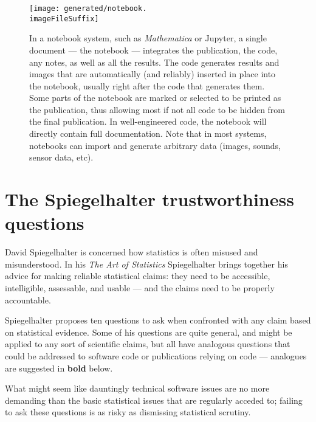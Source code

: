 \documentclass[10pt,a4paper]{article}
\begin{document}
\begin{figure}[t]
   \centering
   \texttt{[image: generated/notebook.\\imageFileSuffix]} 
   \caption{In a notebook system, such as \emph{Mathematica\/} or Jupyter, a single document --- the notebook --- integrates the publication, the code, any notes, as well as all the results. The code generates results and images that are automatically (and reliably) inserted in place into the notebook, usually right after the code that generates them. Some parts of the notebook are marked or selected to be printed as the publication, thus allowing most if not all code to be hidden from the final publication. In well-engineered code, the notebook will directly contain full documentation.
Note that in most systems, notebooks can import and generate arbitrary data (images, sounds, sensor data, etc).}
   \label{supplement-fig:notebook}
\end{figure}

\section{The Spiegelhalter trustworthiness questions}
\label{supplement-Spiegelhalter-section}

David Spiegelhalter is concerned how statistics is often misused and misunderstood. In his \emph{The Art of Statistics\/} \cite{Spiegelhalter} Spiegelhalter brings together his advice for making reliable statistical claims: they need to be accessible, intelligible, assessable, and usable --- and the claims need to be properly accountable. 

Spiegelhalter proposes ten questions to ask when confronted with any claim based on statistical evidence. Some of his questions are quite general, and might be applied to any sort of scientific claims, but all have analogous questions that could be addressed to software code or publications relying on code --- analogues are suggested in \textbf{bold} below. 

What might seem like dauntingly technical software issues are no more demanding than the basic statistical issues that are regularly acceded to; failing to ask these questions is as risky as dismissing statistical scrutiny.

\def\question#1{\item \emph{#1\/}}
\def\sequestion#1{\begin{itemize}\raggedright\item[$\blacktriangleright$] \textbf{#1}\end{itemize}}
\end{document}
